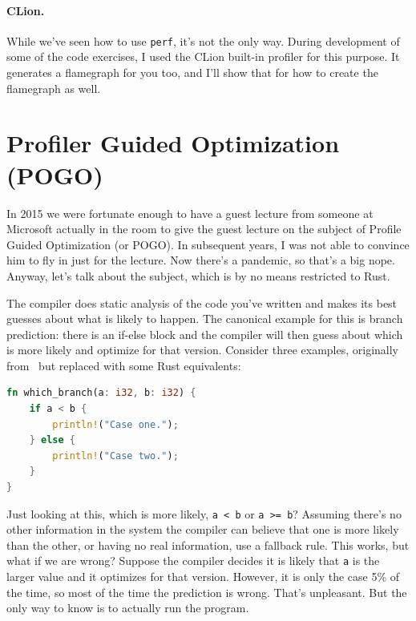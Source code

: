 \documentclass[a4paper]{report}
\begin{document}
\paragraph{CLion.} While we've seen how to use \texttt{perf}, it's not the only way. During development of some of the code exercises, I used the CLion built-in profiler for this purpose. It generates a flamegraph for you too, and I'll show that for how to create the flamegraph as well.

\section*{Profiler Guided Optimization (POGO)}

In 2015 we were fortunate enough to have a guest lecture from someone at Microsoft actually in the room to give the guest lecture on the subject of Profile Guided Optimization (or POGO). In subsequent years, I was not able to convince him to fly in just for the lecture. Now there's a pandemic, so that's a big nope. Anyway, let's talk about the subject, which is by no means restricted to Rust.

The compiler does static analysis of the code you've written and makes its best guesses about what is likely to happen. The canonical example for this is branch prediction: there is an if-else block and the compiler will then guess about which is more likely and optimize for that version. Consider three examples, originally from~\cite{pogo} but replaced with some Rust equivalents:

\begin{lstlisting}[language=Rust]
fn which_branch(a: i32, b: i32) {
    if a < b {
        println!("Case one.");
    } else {
        println!("Case two.");
    }
}
\end{lstlisting}

Just looking at this, which is more likely, \texttt{a < b} or \texttt{a >= b}? Assuming there's no other information in the system the compiler can believe that one is more likely than the other, or having no real information, use a fallback rule. This works, but what if we are wrong? Suppose the compiler decides it is likely that \texttt{a} is the larger value and it optimizes for that version. However, it is only the case 5\% of the time, so most of the time the prediction is wrong. That's unpleasant. But the only way to know is to actually run the program.
\end{document}
